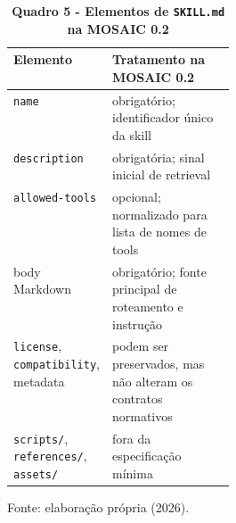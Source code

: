 \begin{table}[H]
\centering
\caption*{\textbf{Quadro 5 - Elementos de \texttt{SKILL.md} na MOSAIC 0.2}}
\small
\renewcommand{\arraystretch}{1.16}
\begin{tabularx}{\linewidth}{|p{0.29\linewidth}|Y|}
\hline
\textbf{Elemento} & \textbf{Tratamento na MOSAIC 0.2} \\
\hline
\texttt{name} & obrigatório; identificador único da skill \\
\hline
\texttt{description} & obrigatória; sinal inicial de retrieval \\
\hline
\texttt{allowed-tools} & opcional; normalizado para lista de nomes de tools \\
\hline
body Markdown & obrigatório; fonte principal de roteamento e instrução \\
\hline
\texttt{license}, \texttt{compatibility}, metadata &
podem ser preservados, mas não alteram os contratos normativos \\
\hline
\texttt{scripts/}, \texttt{references/}, \texttt{assets/} &
fora da especificação mínima \\
\hline
\end{tabularx}
\par\smallskip\raggedright\small Fonte: elaboração própria (2026).
\end{table}
